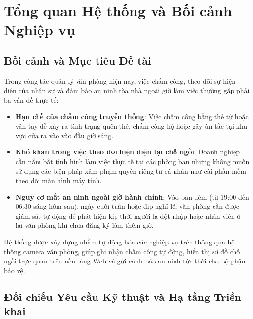 \documentclass[12pt,a4paper]{article}
\begin{document}
\section{Tổng quan Hệ thống và Bối cảnh Nghiệp vụ}

\subsection{Bối cảnh và Mục tiêu Đề tài}
Trong công tác quản lý văn phòng hiện nay, việc chấm công, theo dõi sự hiện diện của nhân sự và đảm bảo an ninh tòa nhà ngoài giờ làm việc thường gặp phải ba vấn đề thực tế:
\begin{itemize}[leftmargin=1.5em, itemsep=3pt]
    \item \textbf{Hạn chế của chấm công truyền thống}: Việc chấm công bằng thẻ từ hoặc vân tay dễ xảy ra tình trạng quên thẻ, chấm công hộ hoặc gây ùn tắc tại khu vực cửa ra vào vào đầu giờ sáng.
    \item \textbf{Khó khăn trong việc theo dõi hiện diện tại chỗ ngồi}: Doanh nghiệp cần nắm bắt tình hình làm việc thực tế tại các phòng ban nhưng không muốn sử dụng các biện pháp xâm phạm quyền riêng tư cá nhân như cài phần mềm theo dõi màn hình máy tính.
    \item \textbf{Nguy cơ mất an ninh ngoài giờ hành chính}: Vào ban đêm (từ 19:00 đến 06:30 sáng hôm sau), ngày cuối tuần hoặc dịp nghỉ lễ, văn phòng cần được giám sát tự động để phát hiện kịp thời người lạ đột nhập hoặc nhân viên ở lại văn phòng khi chưa đăng ký làm thêm giờ.
\end{itemize}

Hệ thống được xây dựng nhằm tự động hóa các nghiệp vụ trên thông qua hệ thống camera văn phòng, giúp ghi nhận chấm công tự động, hiển thị sơ đồ chỗ ngồi trực quan trên nền tảng Web và gửi cảnh báo an ninh tức thời cho bộ phận bảo vệ.

\subsection{Đối chiếu Yêu cầu Kỹ thuật và Hạ tầng Triển khai}
\end{document}
